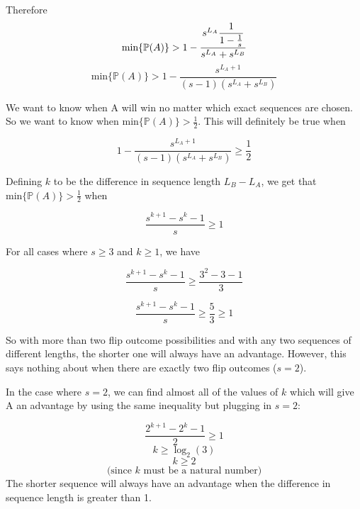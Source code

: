 \documentclass[english,12pt,a4paper,final]{article}
\begin{document}
Therefore
\begin{equation*}
	\text{min}\{\mathbb{P}(A)\} > 1 - \frac{s^{L_A}\mathlarger{\frac{1}{1-\frac{1}{s}}}}{s^{L_A} + s^{L_B}}
\end{equation*}
\begin{equation*}
	\text{min}\{\mathbb{P}(A)\} > 1 - \frac{s^{L_A+1}}{(s-1)(s^{L_A}+s^{L_B})}
\end{equation*}

We want to know when A will win no matter which exact sequences are chosen. So we want to know when $\text{min}\{\mathbb{P}(A)\} > \frac{1}{2}$. This will definitely be true when

\begin{equation*}
	1 - \frac{s^{L_A+1}}{(s-1)(s^{L_A}+s^{L_B})} \ge \frac{1}{2}
\end{equation*}

Defining $k$ to be the difference in sequence length $L_B-L_A$, we get that $\text{min}\{\mathbb{P}(A)\} > \frac{1}{2}$ when

\begin{equation*}
	\frac{s^{k+1}-s^k-1}{s} \ge 1
\end{equation*}

For all cases where $s \ge 3$ and $k \ge 1$, we have 

\begin{equation*}
	\frac{s^{k+1}-s^k-1}{s} \ge \frac{3^2-3-1}{3}
\end{equation*}

\begin{equation*}
	\frac{s^{k+1}-s^k-1}{s} \ge \frac{5}{3} \ge 1
\end{equation*}

So with more than two flip outcome possibilities and with any two sequences of different lengths, the shorter one will always have an advantage. However, this says nothing about when there are exactly two flip outcomes ($s=2$).

In the case where $s=2$, we can find almost all of the values of $k$ which will give A an advantage by using the same inequality but plugging in $s=2$:

\begin{equation*}
	\frac{2^{k+1}-2^k-1}{2} \ge 1
\end{equation*}
\begin{equation*}
	k \ge \log_2(3)
\end{equation*}
\begin{equation*}
	k \ge 2
\end{equation*}
\begin{equation*}
	 \text{(since $k$ must be a natural number)}
\end{equation*}
The shorter sequence will always have an advantage when the difference in sequence length is greater than 1.
\end{document}
